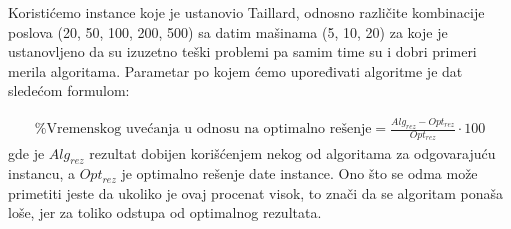 \documentclass[a4paper]{article}
\begin{document}
Koristićemo instance koje je ustanovio Taillard, odnosno različite kombinacije poslova (20, 50, 100, 200, 500) sa datim mašinama (5, 10, 20) za koje je ustanovljeno da su izuzetno teški problemi pa samim time su i dobri primeri merila algoritama. Parametar po kojem ćemo upoređivati algoritme je dat sledećom formulom:

\begin{gather*}
\textrm{\% Vremenskog uvećanja u odnosu na optimalno rešenje} = \frac{Alg_{rez} - Opt_{rez}}{Opt_{rez}} \cdot100
\end{gather*}
gde je $Alg_{rez}$ rezultat dobijen korišćenjem nekog od algoritama za odgovarajuću instancu, a $Opt_{rez}$ je optimalno rešenje date instance. Ono što se odma može primetiti jeste da ukoliko je ovaj procenat visok, to znači da se algoritam ponaša loše, jer za toliko odstupa od optimalnog rezultata.
\\
\end{document}
